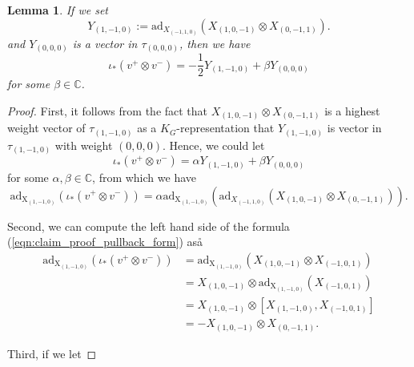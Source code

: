 \documentclass[11pt, a4paper]{amsart}
\theoremstyle{plain}
\newtheorem{lemma}[theorem]{Lemma}
\theoremstyle{definition}
\numberwithin{equation}{section}
\def\CC{\mathbb{C}}
\begin{document}
\begin{lemma}
\label{Lemma: pushforward of v}
    If we set
    \begin{equation*}
        Y_{(1, -1, 0)}:= \mathrm{ad}_{X_{(-1, 1, 0)}}(X_{(1, 0, -1)} \otimes X_{(0, -1, 1)}). 
    \end{equation*} and $Y_{(0, 0, 0)}$ is a vector in $\tau_{(0, 0, 0)}$, then we have 
    \begin{equation*}
        \iota_{*} (v^{+} \otimes v^{-}) = -\frac{1}{2} Y_{(1, -1, 0)} + \beta Y_{(0, 0, 0)}
    \end{equation*}
    for some $\beta \in \CC$.
\end{lemma}

\begin{proof}
    First, it follows from the fact that $X_{(1, 0, -1)} \otimes X_{(0, -1, 1)}$ is a highest weight vector of $\tau_{(1, -1, 0)}$ as a $K_G$-representation that 
    $Y_{(1, -1, 0)}$ is vector in $\tau_{(1, -1, 0)}$ with weight $(0, 0, 0)$. Hence, we could let 
    \begin{equation*}
        \iota_{*} (v^{+} \otimes v^{-}) = \alpha Y_{(1, -1, 0)} + \beta Y_{(0, 0, 0)}
    \end{equation*}
    for some $\alpha, \beta \in \CC$, from which we have 
    \begin{equation}
    \label{eqn:claim_proof_pullback_form}
        \mathrm{ad_{X_{(1, -1, 0)}}}( \iota_{*} (v^{+} \otimes v^{-})) = \alpha \mathrm{ad_{X_{(1, -1, 0)}}}(\mathrm{ad}_{X_{(-1, 1, 0)}}(X_{(1, 0, -1)} \otimes X_{(0, -1, 1)})). 
    \end{equation}
    \par Second, we can compute the left hand side of the formula (\ref{eqn:claim_proof_pullback_form}) aså 
    \begin{align*}
        \mathrm{ad_{X_{(1, -1, 0)}}}( \iota_{*} (v^{+} \otimes v^{-})) & = \mathrm{ad_{X_{(1, -1, 0)}}}(X_{(1, 0, -1)} \otimes X_{(-1, 0, 1)}) \\
                                                                   & = X_{(1, 0, -1)} \otimes \mathrm{ad_{X_{(1, -1, 0)}}}(X_{(-1, 0, 1)}) \\
                                                                   & = X_{(1, 0, -1)} \otimes [X_{(1, -1, 0)}, X_{(-1, 0, 1)}] \\
                                                                   & = - X_{(1, 0, -1)} \otimes X_{(0, -1, 1)}. 
    \end{align*}
    \par Third, if we let 

\end{proof}
\end{document}
